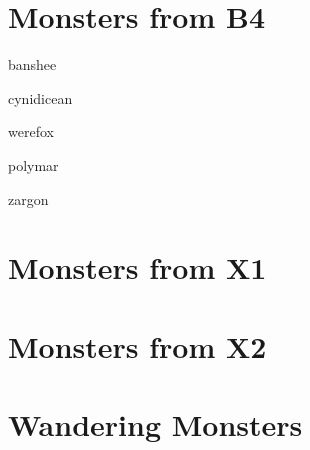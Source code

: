 \documentclass[letterpaper,serif]{module}
\begin{document}
\part{Monsters from B4}

\begin{newmonster}{banshee}\end{newmonster}
\begin{newmonster}{cynidicean}\end{newmonster}
\begin{newmonster}{werefox}\end{newmonster}
\begin{newmonster}{polymar}\end{newmonster}
\begin{newmonster}{zargon}\end{newmonster}

\part{Monsters from X1}
\part{Monsters from X2}

\onecolumn

\part{Wandering Monsters}
\end{document}
